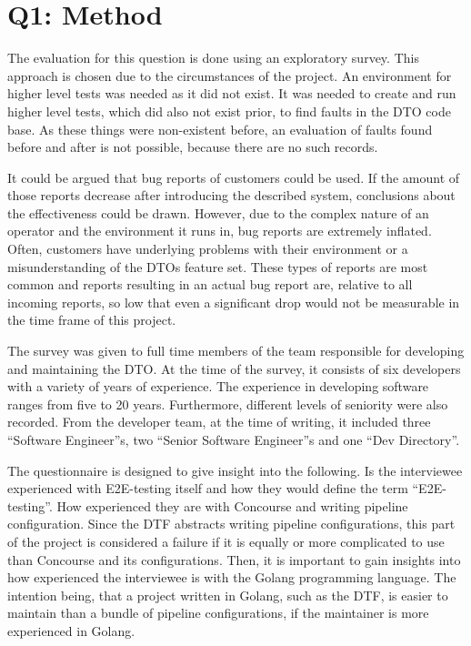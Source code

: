 \section{Q1: Method}\label{sec:q1:-how-useful-is-the-dtf-in-a-practical-context?}

The evaluation for this question is done using an exploratory survey.
This approach is chosen due to the circumstances of the project.
An environment for higher level tests was needed as it did not exist.
It was needed to create and run higher level tests, which did also not exist prior, to find faults in the DTO code base.
As these things were non-existent before, an evaluation of faults found before and after is not possible, because there are no such records.

It could be argued that bug reports of customers could be used.
If the amount of those reports decrease after introducing the described system, conclusions about the effectiveness could be drawn.
However, due to the complex nature of an operator and the environment it runs in, bug reports are extremely inflated.
Often, customers have underlying problems with their environment or a misunderstanding of the DTOs feature set.
These types of reports are most common and reports resulting in an actual bug report are, relative to all incoming reports, so low that even a significant drop would not be measurable in the time frame of this project.

The survey was given to full time members of the team responsible for developing and maintaining the DTO.
At the time of the survey, it consists of six developers with a variety of years of experience.
The experience in developing software ranges from five to 20 years.
Furthermore, different levels of seniority were also recorded.
From the developer team, at the time of writing, it included three ``Software Engineer''s, two ``Senior Software Engineer''s and one ``Dev Directory''.

The questionnaire is designed to give insight into the following.
Is the interviewee experienced with E2E-testing itself and how they would define the term ``E2E-testing''.
How experienced they are with Concourse and writing pipeline configuration.
Since the DTF abstracts writing pipeline configurations, this part of the project is considered a failure if it is equally or more complicated to use than Concourse and its configurations.
Then, it is important to gain insights into how experienced the interviewee is with the Golang programming language.
The intention being, that a project written in Golang, such as the DTF, is easier to maintain than a bundle of pipeline configurations, if the maintainer is more experienced in Golang.

